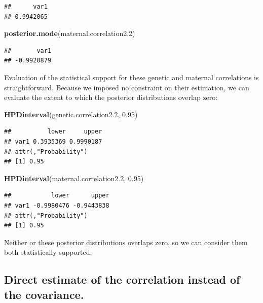 \documentclass[
  12pt,
]{book}
\newenvironment{Shaded}{\begin{snugshade}}{\end{snugshade}}
\newcommand{\FloatTok}[1]{\textcolor[rgb]{0.00,0.00,0.81}{#1}}
\newcommand{\KeywordTok}[1]{\textcolor[rgb]{0.13,0.29,0.53}{\textbf{#1}}}
\newcommand{\NormalTok}[1]{#1}
\begin{document}
\begin{verbatim}
##      var1 
## 0.9942065
\end{verbatim}

\begin{Shaded}
\begin{Highlighting}[]
\KeywordTok{posterior.mode}\NormalTok{(maternal.correlation2}\FloatTok{.2}\NormalTok{)}
\end{Highlighting}
\end{Shaded}

\begin{verbatim}
##       var1 
## -0.9920879
\end{verbatim}

Evaluation of the statistical support for these genetic and maternal correlations is straightforward. Because we imposed no constraint on their estimation, we can evaluate the extent to which the posterior distributions overlap zero:

\begin{Shaded}
\begin{Highlighting}[]
\KeywordTok{HPDinterval}\NormalTok{(genetic.correlation2}\FloatTok{.2}\NormalTok{, }\FloatTok{0.95}\NormalTok{)}
\end{Highlighting}
\end{Shaded}

\begin{verbatim}
##          lower     upper
## var1 0.3935369 0.9990187
## attr(,"Probability")
## [1] 0.95
\end{verbatim}

\begin{Shaded}
\begin{Highlighting}[]
\KeywordTok{HPDinterval}\NormalTok{(maternal.correlation2}\FloatTok{.2}\NormalTok{, }\FloatTok{0.95}\NormalTok{)}
\end{Highlighting}
\end{Shaded}

\begin{verbatim}
##           lower      upper
## var1 -0.9980476 -0.9443838
## attr(,"Probability")
## [1] 0.95
\end{verbatim}

Neither or these posterior distributions overlaps zero, so we can consider them both statistically supported.

\hypertarget{direct-estimate-of-the-correlation-instead-of-the-covariance.}{%
\subsection{Direct estimate of the correlation instead of the covariance.}\label{direct-estimate-of-the-correlation-instead-of-the-covariance.}}
\end{document}
